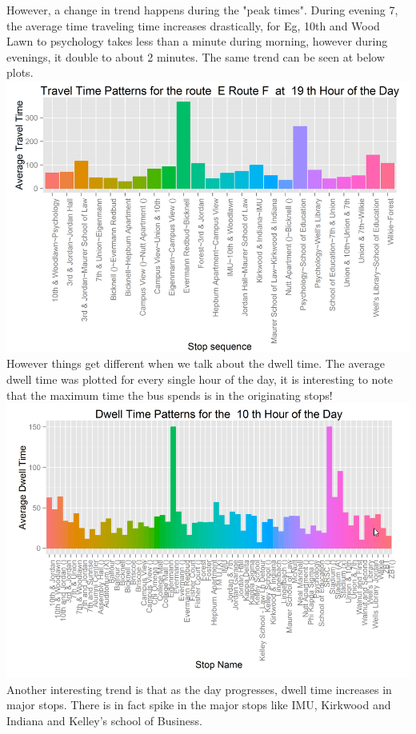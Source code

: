 \documentclass[12pt]{article}
\begin{document}
However, a change in trend happens during the "peak times". During evening 7, the average time traveling time increases drastically, for Eg, 10th and Wood Lawn to psychology takes less than a minute during morning, however during evenings, it double to about 2 minutes. The same trend can be seen at below plots. \\
\includegraphics[scale=0.4]{resources/ggplot3}\\[1cm] 
However things get different when we talk about the dwell time. The average dwell time was plotted for every single hour of the day, it is interesting to note that the maximum time the bus spends is in the originating stops! \\
\includegraphics[scale=0.4]{resources/ggplot4}\\[1cm] 
Another interesting trend is that as the day progresses, dwell time increases in major stops. There is in fact spike in the major stops like IMU, Kirkwood and Indiana and Kelley's school of Business. \\
\end{document}
